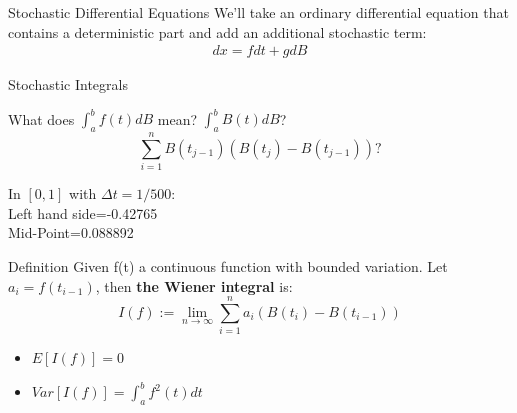 \begin{frame}{Stochastic Differential Equations}
\pause
We'll take an ordinary differential equation that contains a deterministic part and add an additional stochastic term:
\begin{eqnarray*}
dx=fdt+gdB
\end{eqnarray*}
\end{frame}

\begin{frame}{Stochastic Integrals}
\pause
\begin{center}
What does $\int_{a}^{b} f(t)dB$ mean? \bigskip \pause  $\int_{a}^{b} B(t)dB$?\pause \\

\begin{equation*}
\sum_{i=1}^{n}B(t_{j-1})\left( B(t_{j})-B(t_{j-1})\right) ?
\end{equation*}
\pause
\bigskip

In $[0,1]$ with $\Delta t=1/500$:\\ 
Left hand side=-0.42765\\ 
Mid-Point=0.088892
\end{center}
\end{frame}


\begin{frame}
\begin{block}{Definition}
Given f(t) a continuous function with bounded variation. Let $a_i=f(t_{i-1})$, then \textbf{the Wiener integral} is:
\begin{equation*}
I(f):=\lim_{n \to \infty}\sum_{i=1}^{n}a_i(B(t_i)-B(t_{i-1}))
\end{equation*}
\pause
\begin{itemize}
\item $E[I(f)]=0$
\item $Var[I(f)]=\int_{a}^{b}f^2(t)dt$
\end{itemize}
\end{block}
\end{frame}
